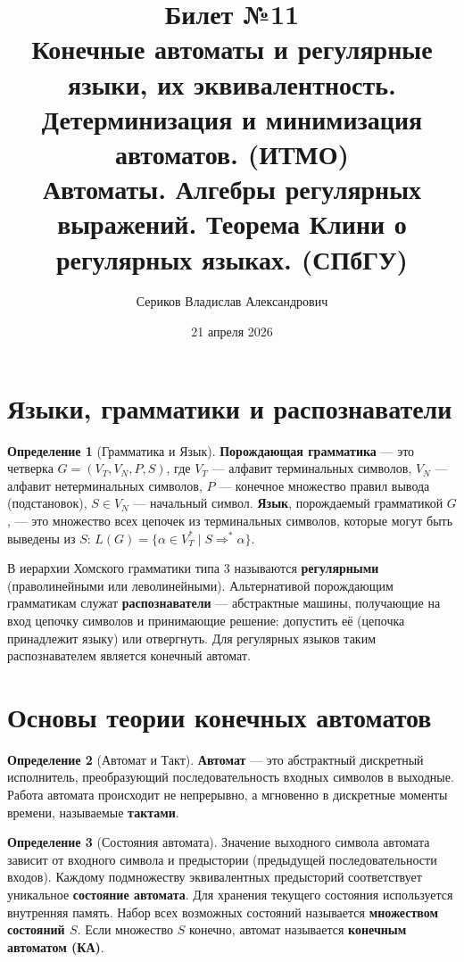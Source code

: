 \documentclass[12pt,a4paper]{article}
\title{Билет №11 \\ \small Конечные автоматы и регулярные языки, их эквивалентность. Детерминизация и минимизация автоматов. (ИТМО) \\ Автоматы. Алгебры регулярных выражений. Теорема Клини о регулярных языках. (СПбГУ)}
\author{Сериков Владислав Александрович}
\date{21 апреля 2026}
\theoremstyle{definition}
\newtheorem{definition}{Определение}
\theoremstyle{plain}
\theoremstyle{remark}
\begin{document}
\maketitle
\tableofcontents
\newpage

\section{Языки, грамматики и распознаватели}

\begin{definition}[Грамматика и Язык]
\textbf{Порождающая грамматика} — это четверка $G = (V_T, V_N, P, S)$, где $V_T$ — алфавит терминальных символов, $V_N$ — алфавит нетерминальных символов, $P$ — конечное множество правил вывода (подстановок), $S \in V_N$ — начальный символ.
\textbf{Язык}, порождаемый грамматикой $G$, — это множество всех цепочек из терминальных символов, которые могут быть выведены из $S$: $L(G) = \{\alpha \in V_T^* \mid S \Rightarrow^* \alpha\}$.
\end{definition}

В иерархии Хомского грамматики типа 3 называются \textbf{регулярными} (праволинейными или леволинейными). Альтернативой порождающим грамматикам служат \textbf{распознаватели} — абстрактные машины, получающие на вход цепочку символов и принимающие решение: допустить её (цепочка принадлежит языку) или отвергнуть. Для регулярных языков таким распознавателем является конечный автомат.

\section{Основы теории конечных автоматов}

\begin{definition}[Автомат и Такт]
\textbf{Автомат} — это абстрактный дискретный исполнитель, преобразующий последовательность входных символов в выходные. Работа автомата происходит не непрерывно, а мгновенно в дискретные моменты времени, называемые \textbf{тактами}.
\end{definition}

\begin{definition}[Состояния автомата]
Значение выходного символа автомата зависит от входного символа и предыстории (предыдущей последовательности входов). Каждому подмножеству эквивалентных предысторий соответствует уникальное \textbf{состояние автомата}. Для хранения текущего состояния используется внутренняя память. Набор всех возможных состояний называется \textbf{множеством состояний $S$}.
Если множество $S$ конечно, автомат называется \textbf{конечным автоматом (КА)}.
\end{definition}
\end{document}
